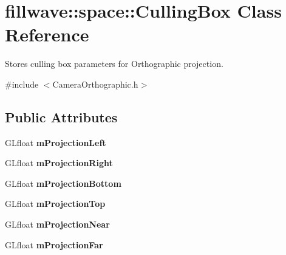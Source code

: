 \hypertarget{structfillwave_1_1space_1_1CullingBox}{}\section{fillwave\+:\+:space\+:\+:Culling\+Box Class Reference}
\label{structfillwave_1_1space_1_1CullingBox}


Stores culling box parameters for Orthographic projection.  




{\ttfamily \#include $<$Camera\+Orthographic.\+h$>$}

\subsection*{Public Attributes}
\begin{DoxyCompactItemize}
\item 
\hypertarget{structfillwave_1_1space_1_1CullingBox_a0da977e177698c82a007e7261229a024}{}G\+Lfloat {\bfseries m\+Projection\+Left}\label{structfillwave_1_1space_1_1CullingBox_a0da977e177698c82a007e7261229a024}

\item 
\hypertarget{structfillwave_1_1space_1_1CullingBox_a9cb0a157a0f85d9a30cec6e7f3ce4cc9}{}G\+Lfloat {\bfseries m\+Projection\+Right}\label{structfillwave_1_1space_1_1CullingBox_a9cb0a157a0f85d9a30cec6e7f3ce4cc9}

\item 
\hypertarget{structfillwave_1_1space_1_1CullingBox_a7664d25151a317eac48fe9bc480de2dd}{}G\+Lfloat {\bfseries m\+Projection\+Bottom}\label{structfillwave_1_1space_1_1CullingBox_a7664d25151a317eac48fe9bc480de2dd}

\item 
\hypertarget{structfillwave_1_1space_1_1CullingBox_a35be2f6d1e2f12fb0eb01512642afa94}{}G\+Lfloat {\bfseries m\+Projection\+Top}\label{structfillwave_1_1space_1_1CullingBox_a35be2f6d1e2f12fb0eb01512642afa94}

\item 
\hypertarget{structfillwave_1_1space_1_1CullingBox_a3e01d5a122c158400cb2b7225f07dfd4}{}G\+Lfloat {\bfseries m\+Projection\+Near}\label{structfillwave_1_1space_1_1CullingBox_a3e01d5a122c158400cb2b7225f07dfd4}

\item 
\hypertarget{structfillwave_1_1space_1_1CullingBox_afe329167202cfbe485f3e095c2589ad6}{}G\+Lfloat {\bfseries m\+Projection\+Far}\label{structfillwave_1_1space_1_1CullingBox_afe329167202cfbe485f3e095c2589ad6}

\end{DoxyCompactItemize}


